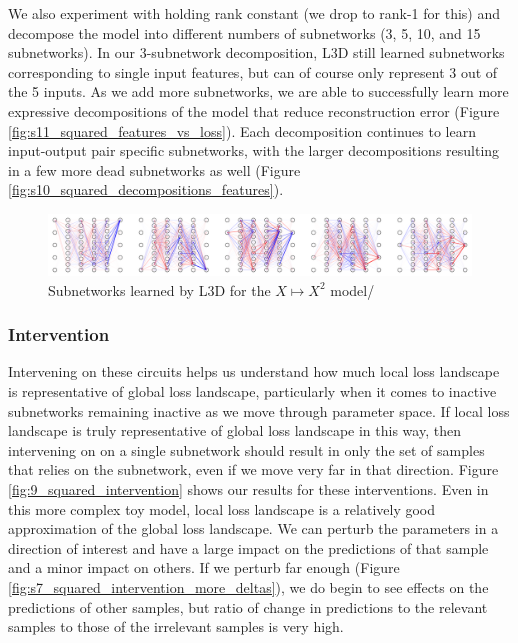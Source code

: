 \documentclass{article}
\theoremstyle{plain}
\theoremstyle{definition}
\theoremstyle{remark}
\begin{document}
We also experiment with holding rank constant (we drop to rank-1 for this) and decompose the model into different numbers of subnetworks (3, 5, 10, and 15 subnetworks). In our 3-subnetwork decomposition, L3D still learned subnetworks corresponding to single input features, but can of course only represent 3 out of the 5 inputs. As we add more subnetworks, we are able to successfully learn more expressive decompositions of the model that reduce reconstruction error (Figure \ref{fig:s11_squared_features_vs_loss}). Each decomposition continues to learn input-output pair specific subnetworks, with the larger decompositions resulting in a few more dead subnetworks as well (Figure \ref{fig:s10_squared_decompositions_features}).

\begin{figure}[htbp]
    \centerline{\includegraphics[width=\textwidth]{../figures/8_squared_subnetworks.pdf}}
    \centering
    \caption{Subnetworks learned by L3D for the $X \mapsto X^2$ model/}\label{fig:8_squared_subnetworks}
\end{figure}

\subsubsection{Intervention}

Intervening on these circuits helps us understand how much local loss landscape is representative of global loss landscape, particularly when it comes to inactive subnetworks remaining inactive as we move through parameter space. If local loss landscape is truly representative of global loss landscape in this way, then intervening on on a single subnetwork should result in only the set of samples that relies on the subnetwork, even if we move very far in that direction. Figure \ref{fig:9_squared_intervention} shows our results for these interventions. Even in this more complex toy model, local loss landscape is a relatively good approximation of the global loss landscape. We can perturb the parameters in a direction of interest and have a large impact on the predictions of that sample and a minor impact on others. If we perturb far enough (Figure \ref{fig:s7_squared_intervention_more_deltas}), we do begin to see effects on the predictions of other samples, but ratio of change in predictions to the relevant samples to those of the irrelevant samples is very high.
\end{document}
